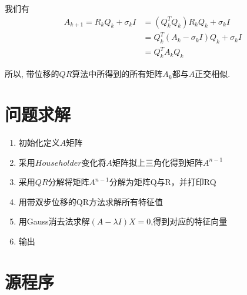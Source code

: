 我们有
\begin{align*}
A_{k+1}=R_kQ_k+\sigma_kI&=(Q^T_kQ_k)R_kQ_k+\sigma_kI\\
&=Q^T_k(A_k-\sigma_kI)Q_k+\sigma_kI\\
&=Q^T_kA_kQ_k
\end{align*}

所以, 带位移的$QR$算法中所得到的所有矩阵$A_k$都与$A$正交相似.

\newpage
\chapter{问题求解}
\begin{enumerate}
\item 初始化定义$A$矩阵

\item 采用$Householder$变化将$A$矩阵拟上三角化得到矩阵$A^{n-1}$

\item 采用$QR$分解将矩阵$A^{n-1}$分解为矩阵Q与R，并打印RQ

\item 用带双步位移的QR方法求解所有特征值

\item 用Gauss消去法求解$(A-\lambda I)X=0$,得到对应的特征向量

\item 输出
\end{enumerate}
\newpage


\chapter{源程序}
